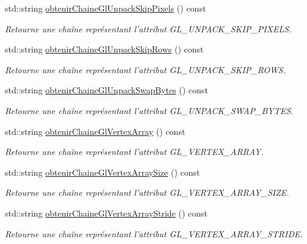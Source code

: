 \begin{DoxyCompactItemize}
std\-::string \hyperlink{group__utilitaire_gaa0abd9dc2b1158d657d9553424732bb8}{obtenir\-Chaine\-Gl\-Unpack\-Skip\-Pixels} () const 
\begin{DoxyCompactList}\small\item\em Retourne une chaîne représentant l'attribut G\-L\-\_\-\-U\-N\-P\-A\-C\-K\-\_\-\-S\-K\-I\-P\-\_\-\-P\-I\-X\-E\-L\-S. \end{DoxyCompactList}\item 
std\-::string \hyperlink{group__utilitaire_gaa4065b05943d7e949fd785f85dd3cdc2}{obtenir\-Chaine\-Gl\-Unpack\-Skip\-Rows} () const 
\begin{DoxyCompactList}\small\item\em Retourne une chaîne représentant l'attribut G\-L\-\_\-\-U\-N\-P\-A\-C\-K\-\_\-\-S\-K\-I\-P\-\_\-\-R\-O\-W\-S. \end{DoxyCompactList}\item 
std\-::string \hyperlink{group__utilitaire_gaa9b797c3176f4a4cb2094550ebaab4d9}{obtenir\-Chaine\-Gl\-Unpack\-Swap\-Bytes} () const 
\begin{DoxyCompactList}\small\item\em Retourne une chaîne représentant l'attribut G\-L\-\_\-\-U\-N\-P\-A\-C\-K\-\_\-\-S\-W\-A\-P\-\_\-\-B\-Y\-T\-E\-S. \end{DoxyCompactList}\item 
std\-::string \hyperlink{group__utilitaire_gaaa758212d7a3f274415edbc9e2532289}{obtenir\-Chaine\-Gl\-Vertex\-Array} () const 
\begin{DoxyCompactList}\small\item\em Retourne une chaîne représentant l'attribut G\-L\-\_\-\-V\-E\-R\-T\-E\-X\-\_\-\-A\-R\-R\-A\-Y. \end{DoxyCompactList}\item 
std\-::string \hyperlink{group__utilitaire_ga5475c8155f182e7c018cca2f6124f746}{obtenir\-Chaine\-Gl\-Vertex\-Array\-Size} () const 
\begin{DoxyCompactList}\small\item\em Retourne une chaîne représentant l'attribut G\-L\-\_\-\-V\-E\-R\-T\-E\-X\-\_\-\-A\-R\-R\-A\-Y\-\_\-\-S\-I\-Z\-E. \end{DoxyCompactList}\item 
std\-::string \hyperlink{group__utilitaire_ga7830e4ba0be698e54d824a5c6a430f5d}{obtenir\-Chaine\-Gl\-Vertex\-Array\-Stride} () const 
\begin{DoxyCompactList}\small\item\em Retourne une chaîne représentant l'attribut G\-L\-\_\-\-V\-E\-R\-T\-E\-X\-\_\-\-A\-R\-R\-A\-Y\-\_\-\-S\-T\-R\-I\-D\-E. \end{DoxyCompactList}\item 

\end{DoxyCompactItemize}
